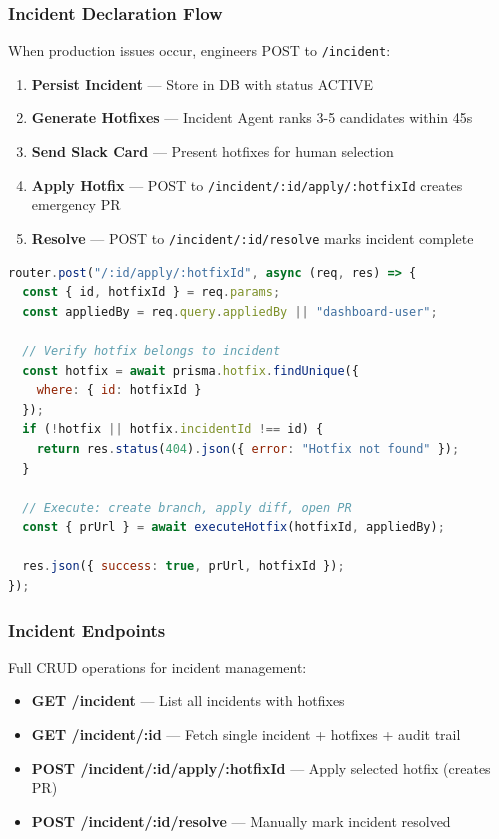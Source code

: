 \documentclass[11pt,a4paper]{article}
\begin{document}
\subsubsection{Incident Declaration Flow}
When production issues occur, engineers POST to \texttt{/incident}:

\begin{enumerate}[leftmargin=*]
    \item \textbf{Persist Incident} --- Store in DB with status ACTIVE
    \item \textbf{Generate Hotfixes} --- Incident Agent ranks 3-5 candidates within 45s
    \item \textbf{Send Slack Card} --- Present hotfixes for human selection
    \item \textbf{Apply Hotfix} --- POST to \texttt{/incident/:id/apply/:hotfixId} creates emergency PR
    \item \textbf{Resolve} --- POST to \texttt{/incident/:id/resolve} marks incident complete
\end{enumerate}

\begin{lstlisting}[language=JavaScript,caption=Incident Hotfix Application (routes/incident.ts)]
router.post("/:id/apply/:hotfixId", async (req, res) => {
  const { id, hotfixId } = req.params;
  const appliedBy = req.query.appliedBy || "dashboard-user";
  
  // Verify hotfix belongs to incident
  const hotfix = await prisma.hotfix.findUnique({
    where: { id: hotfixId }
  });
  if (!hotfix || hotfix.incidentId !== id) {
    return res.status(404).json({ error: "Hotfix not found" });
  }
  
  // Execute: create branch, apply diff, open PR
  const { prUrl } = await executeHotfix(hotfixId, appliedBy);
  
  res.json({ success: true, prUrl, hotfixId });
});
\end{lstlisting}

\subsubsection{Incident Endpoints}
Full CRUD operations for incident management:

\begin{itemize}
    \item \textbf{GET /incident} --- List all incidents with hotfixes
    \item \textbf{GET /incident/:id} --- Fetch single incident + hotfixes + audit trail
    \item \textbf{POST /incident/:id/apply/:hotfixId} --- Apply selected hotfix (creates PR)
    \item \textbf{POST /incident/:id/resolve} --- Manually mark incident resolved
\end{itemize}
\end{document}
